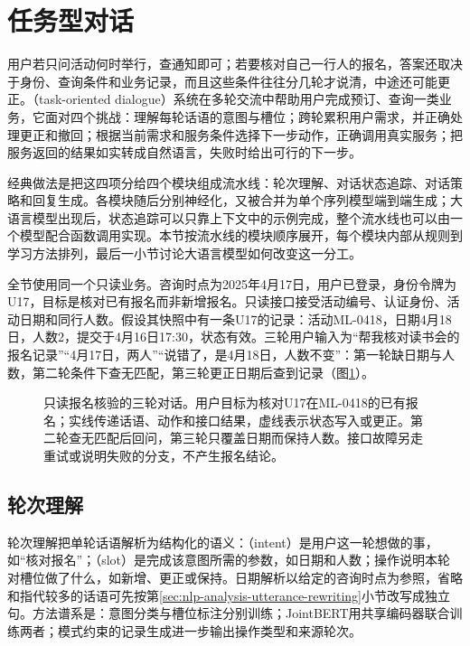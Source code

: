 \section{任务型对话}
\label{sec:nlp-dialogue-task}

用户若只问活动何时举行，查通知即可；若要核对自己一行人的报名，答案还取决于身份、查询条件和业务记录，而且这些条件往往分几轮才说清，中途还可能更正。（task-oriented dialogue）系统在多轮交流中帮助用户完成预订、查询一类业务，它面对四个挑战：理解每轮话语的意图与槽位；跨轮累积用户需求，并正确处理更正和撤回；根据当前需求和服务条件选择下一步动作，正确调用真实服务；把服务返回的结果如实转成自然语言，失败时给出可行的下一步。

经典做法是把这四项分给四个模块组成流水线：轮次理解、对话状态追踪、对话策略和回复生成。各模块随后分别神经化，又被合并为单个序列模型端到端生成；大语言模型出现后，状态追踪可以只靠上下文中的示例完成，整个流水线也可以由一个模型配合函数调用实现。本节按流水线的模块顺序展开，每个模块内部从规则到学习方法排列，最后一小节讨论大语言模型如何改变这一分工。

全节使用同一个只读业务。咨询时点为2025年4月17日，用户已登录，身份令牌为U17，目标是核对已有报名而非新增报名。只读接口接受活动编号、认证身份、活动日期和同行人数。假设其快照中有一条U17的记录：活动ML-0418，日期4月18日，人数2，提交于4月16日17:30，状态有效。三轮用户输入为“帮我核对读书会的报名记录”“4月17日，两人”“说错了，是4月18日，人数不变”：第一轮缺日期与人数，第二轮条件下查无匹配，第三轮更正日期后查到记录（图\ref{fig:nlp-dialogue-state}）。

\begin{figure}[htbp]
  \centering
  
  \caption{只读报名核验的三轮对话。用户目标为核对U17在ML-0418的已有报名；实线传递话语、动作和接口结果，虚线表示状态写入或更正。第二轮查无匹配后回问，第三轮只覆盖日期而保持人数。接口故障另走重试或说明失败的分支，不产生报名结论。}
  \label{fig:nlp-dialogue-state}
\end{figure}
\FloatBarrier

\subsection{轮次理解}
\label{sec:nlp-dialogue-turn}

轮次理解把单轮话语解析为结构化的语义：（intent）是用户这一轮想做的事，如“核对报名”；（slot）是完成该意图所需的参数，如日期和人数；操作说明本轮对槽位做了什么，如新增、更正或保持。日期解析以给定的咨询时点为参照，省略和指代较多的话语可先按第\ref{sec:nlp-analysis-utterance-rewriting}小节改写成独立句。方法谱系是：意图分类与槽位标注分别训练；JointBERT用共享编码器联合训练两者；模式约束的记录生成进一步输出操作类型和来源轮次。

